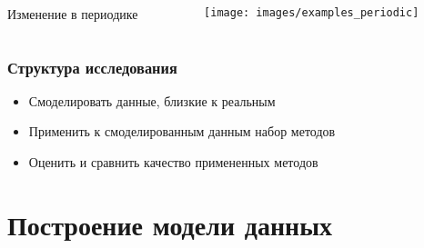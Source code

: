 \documentclass[intlimits, 9pt, unicode]{beamer}
\begin{document}
\begin{frame}
\begin{columns}
\begin{column}{0.5\textwidth}
  \begin{columns}
      \begin{column}{0.3\textwidth}
      \centering
      Изменение в периодике
      \end{column}
      \begin{column}{0.5\textwidth}
      \begin{figure}
		\texttt{[image: images/examples\_periodic]}
	\end{figure}
	\end{column}
     \end{columns}

	\end{column}
	
     \end{columns}

\end{frame}

\begin{frame}
    \frametitle{Структура исследования}

    \begin{itemize}
    	\item Смоделировать данные, близкие к реальным
    \vspace{0.5cm}
	 \item Применить к смоделированным данным набор методов
    \vspace{0.5cm}
        \item Оценить и сравнить качество примененных методов
    \end{itemize}


\end{frame}




\section{Построение модели данных}
\end{document}
